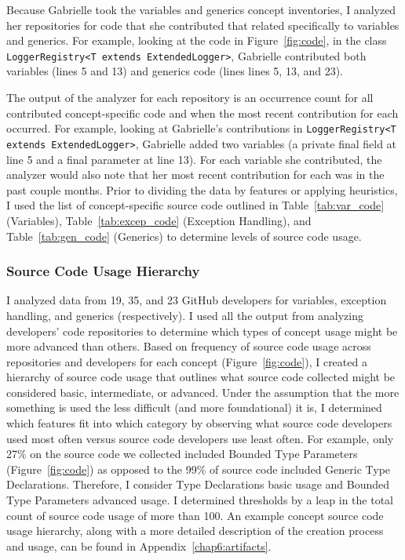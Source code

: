Because Gabrielle took the variables and generics concept inventories, I analyzed her repositories for code that she contributed that related specifically to variables and generics. For example, looking at the code in Figure~\ref{fig:code}, in the class \texttt{LoggerRegistry<T extends ExtendedLogger>}, Gabrielle contributed both variables (lines 5 and 13) and generics code (lines lines 5, 13, and 23). 

The output of the analyzer for each repository is an occurrence count for all contributed concept-specific code and when the most recent contribution for each occurred.
For example, looking at Gabrielle's contributions in \texttt{LoggerRegistry<T extends ExtendedLogger>}, Gabrielle added two variables (a private final field at line 5 and a final parameter at line 13). For each variable she contributed, the analyzer would also note that her most recent contribution for each was in the past couple months.
Prior to dividing the data by features or applying heuristics, I used the list of concept-specific source code outlined in Table~\ref{tab:var_code} (Variables), Table~\ref{tab:excep_code} (Exception Handling), and Table~\ref{tab:gen_code} (Generics) to determine levels of source code usage.

\subsubsection{Source Code Usage Hierarchy}
I analyzed data from 19, 35, and 23 GitHub developers for variables, exception handling, and generics (respectively).
I used all the output from analyzing developers' code repositories to determine which types of concept usage might be more advanced than others. 
Based on frequency of source code usage across repositories and developers for each concept (Figure~\ref{fig:code}), I created a hierarchy of source code usage that outlines what source code collected might be considered basic, intermediate, or advanced. 
Under the assumption that the more something is used the less difficult (and more foundational) it is, I determined which features fit into which category by observing what source code developers used most often versus source code developers use least often. 
For example, only 27\% on the source code we collected included Bounded Type Parameters (Figure~\ref{fig:code}) as opposed to the 99\% of source code included Generic Type Declarations. Therefore, I consider Type Declarations basic usage and Bounded Type Parameters advanced usage. 
I determined thresholds by a leap in the total count of source code usage of more than 100.	
An example concept source code usage hierarchy, along with a more detailed description of the creation process and usage, can be found in Appendix~\ref{chap6:artifacts}.


